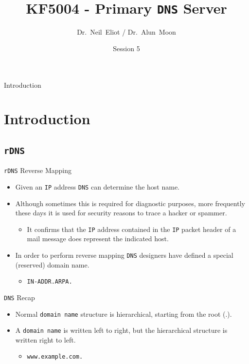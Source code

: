 \documentclass[xcolor=table]{beamer}
\title{KF5004 - Primary \texttt{DNS} Server}
\author{Dr.~Neil~Eliot\inst{1} / Dr.~Alun~Moon\inst{1}}
\institute[Northumbria University] %
{
  \inst{1}
  Department of Computer and Information Sciences\\
  University of Northumbria
}
\date{Session 5}
\begin{document}
\begin{frame}
  \titlepage
\end{frame}

\begin{frame}{Introduction}
  \tableofcontents
\end{frame}


\section{Introduction}
\subsection{\texttt{rDNS}}
\begin{frame}{\texttt{rDNS} Reverse Mapping}
  \begin{itemize}
    \item Given an \texttt{IP} address \texttt{DNS} can determine the host name.
    \item Although sometimes this is required for diagnostic purposes, more frequently these days it is used for security reasons to trace a hacker or spammer.
      \begin{itemize}
        \item It confirms that the \texttt{IP} address contained in the \texttt{IP} packet header of a mail message does represent the indicated host.
      \end{itemize}
    \item In order to perform reverse mapping \texttt{DNS} designers have defined a special (reserved) domain name.
    \begin{itemize}
      \item \texttt{IN-ADDR.ARPA.}
    \end{itemize}
\end{itemize}
\end{frame}

\begin{frame}{\texttt{DNS} Recap}
  \begin{itemize}
    \item Normal \texttt{domain name} structure is hierarchical, starting from the root (.).
    \item A \texttt{domain name} is written left to right, but the hierarchical structure is written right to left.
      \begin{itemize}
        \item \texttt{www.example.com.}
      \end{itemize}
  \end{itemize}
\end{frame}
\end{document}
